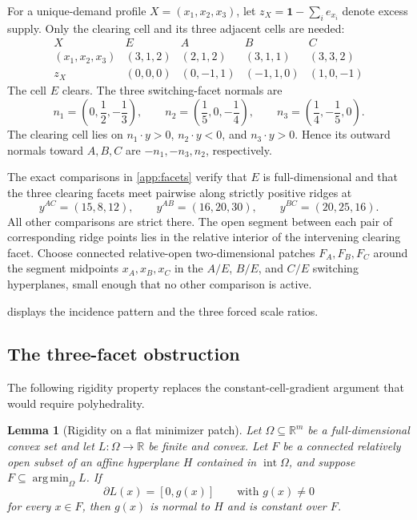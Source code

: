 \documentclass[11pt,a4paper,fleqn]{article}
\theoremstyle{plain}
\newtheorem{lemma}{Lemma}[section]
\theoremstyle{definition}
\newcommand{\R}{\mathbb{R}}
\newcommand{\argmin}{\operatorname*{arg\,min}}
\newcommand{\one}{\mathbf{1}}
\begin{document}
For a unique-demand profile $X=(x_1,x_2,x_3)$, let $z_X=\one-\sum_i e_{x_i}$ denote excess supply. Only the clearing cell and its three adjacent cells are needed:
\begingroup
\setlength{\arraycolsep}{5pt}
\[
\begin{array}{c|cccc}
X&E&A&B&C\\ \hline
(x_1,x_2,x_3)&(3,1,2)&(2,1,2)&(3,1,1)&(3,3,2)\\
z_X&(0,0,0)&(0,-1,1)&(-1,1,0)&(1,0,-1)
\end{array}
\]
\endgroup
The cell $E$ clears. The three switching-facet normals are
\begin{equation}\label{eq:normals}
n_1=\left(0,\frac12,-\frac13\right),
\qquad
n_2=\left(\frac15,0,-\frac14\right),
\qquad
n_3=\left(\frac14,-\frac15,0\right).
\end{equation}
The clearing cell lies on $n_1\cdot y>0$, $n_2\cdot y<0$, and $n_3\cdot y>0$. Hence its outward normals toward $A,B,C$ are $-n_1,-n_3,n_2$, respectively.

The exact comparisons in \ref{app:facets} verify that $E$ is full-dimensional and that the three clearing facets meet pairwise along strictly positive ridges at
\begin{equation}\label{eq:ridge-points}
y^{AC}=(15,8,12),\qquad
y^{AB}=(16,20,30),\qquad
y^{BC}=(20,25,16).
\end{equation}
All other comparisons are strict there. The open segment between each pair of corresponding ridge points lies in the relative interior of the intervening clearing facet. Choose connected relative-open two-dimensional patches $F_A,F_B,F_C$ around the segment midpoints $x_A,x_B,x_C$ in the $A/E$, $B/E$, and $C/E$ switching hyperplanes, small enough that no other comparison is active.

 displays the incidence pattern and the three forced scale ratios.

\subsection{The three-facet obstruction}\label{subsec:three-facet}

The following rigidity property replaces the constant-cell-gradient argument that would require polyhedrality.

\begin{lemma}[Rigidity on a flat minimizer patch]\label{lem:facet-rigidity}
Let $\Omega\subseteq\R^m$ be a full-dimensional convex set and let $L:\Omega\to\R$ be finite and convex. Let $F$ be a connected relatively open subset of an affine hyperplane $H$ contained in $\operatorname{int}\Omega$, and suppose $F\subseteq\argmin_{\Omega} L$. If
\[
\partial L(x)=[0,g(x)]
\qquad\text{with }g(x)\ne0
\]
for every $x\in F$, then $g(x)$ is normal to $H$ and is constant over $F$.
\end{lemma}
\end{document}
